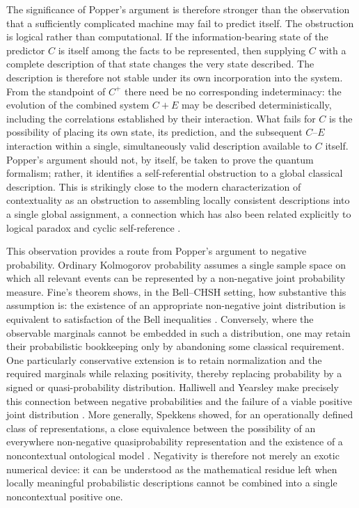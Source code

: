 
The significance of Popper's argument is therefore stronger than the observation that a sufficiently complicated machine may fail to predict itself. The obstruction is logical rather than computational. If the information-bearing state of the predictor $C$ is itself among the facts to be represented, then supplying $C$ with a complete description of that state changes the very state described. The description is therefore not stable under its own incorporation into the system. From the standpoint of $C^{+}$ there need be no corresponding indeterminacy: the evolution of the combined system $C+E$ may be described deterministically, including the correlations established by their interaction. What fails for $C$ is the possibility of placing its own state, its prediction, and the subsequent $C$--$E$ interaction within a single, simultaneously valid description available to $C$ itself. Popper's argument should not, by itself, be taken to prove the quantum formalism; rather, it identifies a self-referential obstruction to a global classical description. This is strikingly close to the modern characterization of contextuality as an obstruction to assembling locally consistent descriptions into a single global assignment, a connection which has also been related explicitly to logical paradox and cyclic self-reference \autocite{Abramsky2015Contextuality,Dourdent2020Godelian}.

This observation provides a route from Popper's argument to negative probability. Ordinary Kolmogorov probability assumes a single sample space on which all relevant events can be represented by a non-negative joint probability measure. Fine's theorem shows, in the Bell--CHSH setting, how substantive this assumption is: the existence of an appropriate non-negative joint distribution is equivalent to satisfaction of the Bell inequalities \autocite{Fine1982Hidden}. Conversely, where the observable marginals cannot be embedded in such a distribution, one may retain their probabilistic bookkeeping only by abandoning some classical requirement. One particularly conservative extension is to retain normalization and the required marginals while relaxing positivity, thereby replacing probability by a signed or quasi-probability distribution. Halliwell and Yearsley make precisely this connection between negative probabilities and the failure of a viable positive joint distribution \autocite{HalliwellYearsley2013}. More generally, Spekkens showed, for an operationally defined class of representations, a close equivalence between the possibility of an everywhere non-negative quasiprobability representation and the existence of a noncontextual ontological model \autocite{Spekkens2008Negativity}. Negativity is therefore not merely an exotic numerical device: it can be understood as the mathematical residue left when locally meaningful probabilistic descriptions cannot be combined into a single noncontextual positive one.

